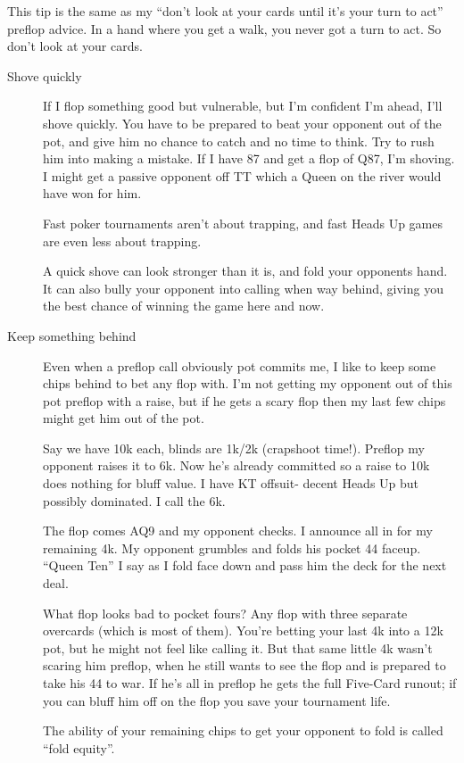 This tip is the same as my ``don't look at your cards until it's your
turn to act'' preflop advice. In a hand where you get a walk, you
never got a turn to act. So don't look at your cards.

\begin{description}

\item[Shove quickly] If I flop something good but vulnerable,
but I'm confident I'm ahead, I'll shove quickly. You have
to be prepared to beat your opponent out of the pot, and
give him no chance to catch and no time to think. Try to
rush him into making a mistake. If I have 87 and get a flop
of Q87, I'm shoving. I might get a passive opponent
off TT which a Queen on the river would have won for him.

Fast poker tournaments aren't about trapping, and fast
Heads Up games are even less about trapping.

A quick shove can look stronger than it is, and fold
your opponents hand. It can also bully your opponent
into calling when way behind, giving you the best
chance of winning the game here and now.

\item[Keep something behind] Even when a preflop call obviously
pot commits me, I like to keep some chips behind to bet
any flop with. I'm not getting my opponent out of this
pot preflop with a raise, but if he gets a scary flop
then my last few chips might get him out of the pot.

Say we have 10k each, blinds are 1k/2k (crapshoot time!).
Preflop my opponent raises it to 6k. Now he's already
committed so a raise to 10k does nothing for bluff value.
I have KT offsuit- decent Heads Up but possibly dominated.
I call the 6k.

The flop comes AQ9 and my opponent checks. I announce
all in for my remaining 4k. My opponent grumbles
and folds his pocket 44 faceup. ``Queen Ten'' I say
as I fold face down and pass him the deck for the next deal.

What flop looks bad to pocket fours? Any flop with three
separate overcards (which is most of them). You're betting
your last 4k into a 12k pot, but he might not feel like calling
it. But that same little 4k wasn't scaring him preflop,
when he still wants to see the flop and is prepared to take
his 44 to war. If he's all in preflop he gets the full Five-Card
runout; if you can bluff him off on the flop you save your tournament
life.

The ability of your remaining chips to get your opponent to
fold is called ``fold equity''.


\end{description}
